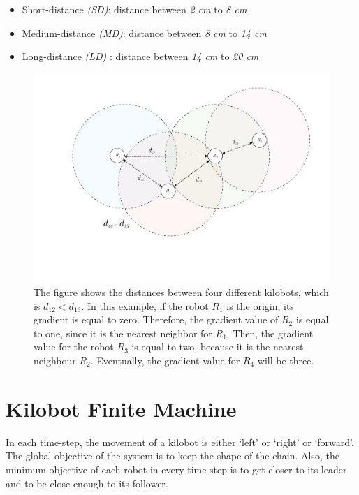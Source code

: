 \documentclass[11pt,a4paper]{article}
\begin{document}
\begin{itemize}
    \item Short-distance \textit{(SD)}: distance between \textit{2 cm} to \textit{8 cm}
    \item Medium-distance \textit{(MD)}: distance between \textit{8 cm} to \textit{14 cm}
    \item Long-distance \textit{(LD)} : distance between \textit{14 cm} to \textit{20 cm}
    
\end{itemize}
 \begin{figure}[h]
     \centering
 \includegraphics[scale=0.4]{Figs/PropagationArea_BW.pdf}
     \caption{ The figure shows the distances between four different kilobots, which is \(d_{12}<d_{13}\). In this example, if the robot $R_1$ is the origin, its gradient is equal to zero.  Therefore, the gradient value of $R_2$ is equal to one, since it is the nearest neighbor for $R_1$. Then, the gradient value for the robot $R_3$ is equal to two, because it is the nearest neighbour $R_2$. Eventually, the gradient value for $R_4$ will be three.  }
     \label{fig:propagation}
  \end{figure}
\section {Kilobot Finite Machine }
In each time-step, the movement of a kilobot is either `left' or `right' or `forward'. The global objective of the system is to keep the shape of the chain. Also, the minimum objective of each robot in every time-step is to get closer to its leader and to be close enough to its follower.  
\end{document}

